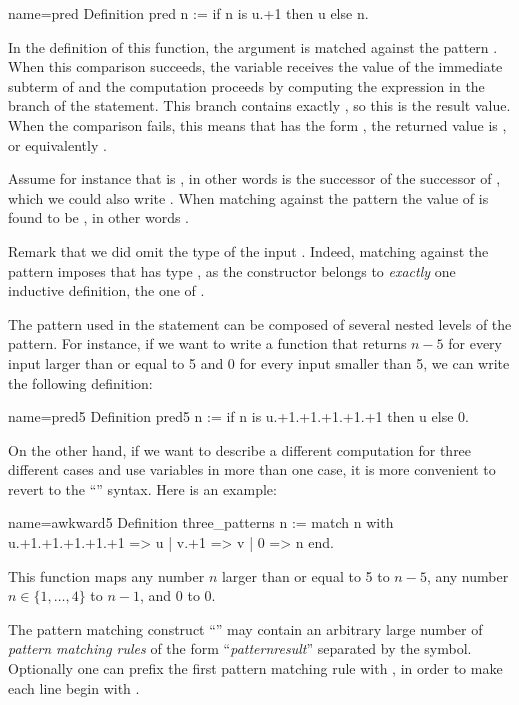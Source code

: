 \begin{coq}{name=pred}{}
Definition pred n := if n is u.+1 then u else n.
\end{coq}

In the definition of this function, the argument  is
matched against the pattern .  When this comparison
succeeds, the variable  receives the value of the immediate
subterm of  and the computation proceeds by computing the expression
in the  branch of the  statement.  This branch contains
exactly , so this is the result value.  When the comparison
fails, this means that  has the form , the returned value is
, or equivalently .

Assume for instance that  is , in other words  is the
successor of the successor of , which we could also write
.  When matching  against the pattern 
the value of  is found to be , in other words .

Remark that we did omit the type of the input . Indeed, matching
 against  the  pattern imposes that  has type
, as the  constructor belongs to \emph{exactly}
one inductive definition, the one of .

The pattern used in the  statement can be composed of
several nested levels of the  pattern.  For instance,
if we want to write a function
that returns \(n-5\) for every input larger than or equal to 5 and 0
for every input smaller than 5, we can write the following definition:

\begin{coq}{name=pred5}{}
Definition pred5 n :=
  if n is u.+1.+1.+1.+1.+1 then u else 0.
\end{coq}
On the other hand, if we want to describe a different computation for
three different cases and use variables in more than one case, it is
more convenient
to revert to the ``'' syntax.  Here is an
example:

\begin{coq}{name=awkward5}{}
Definition three_patterns n :=
  match n with
    u.+1.+1.+1.+1.+1 => u
  | v.+1 => v
  | 0 => n
  end.
\end{coq}
This function maps any number \(n\) larger than or equal to 5 to \(n-5\),
any number \(n \in \{1, \ldots, 4\}\) to \(n-1\), and \(0\) to \(0\).

The pattern matching construct ``'' may contain an
arbitrary large number of {\em pattern matching rules} of the form
``\emph{pattern}\C{ =>$~$}\emph{result}''
separated by the \C{|} symbol.  Optionally one can
prefix the first pattern matching rule with \C{|}, in order to make each line
begin with \C{|}.


